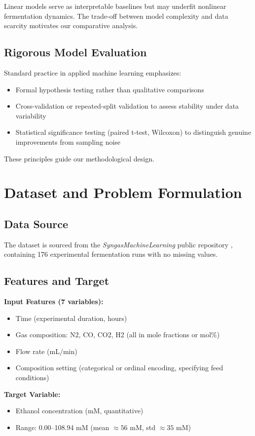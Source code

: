 \documentclass[conference]{IEEEtran}
\begin{document}
Linear models serve as interpretable baselines but may underfit nonlinear fermentation dynamics. The trade-off between model complexity and data scarcity motivates our comparative analysis.

\subsection{Rigorous Model Evaluation}
Standard practice in applied machine learning emphasizes:
\begin{itemize}
\item Formal hypothesis testing rather than qualitative comparisons \cite{breiman2001}
\item Cross-validation or repeated-split validation to assess stability under data variability
\item Statistical significance testing (paired t-test, Wilcoxon) to distinguish genuine improvements from sampling noise
\end{itemize}

These principles guide our methodological design.

\section{Dataset and Problem Formulation}

\subsection{Data Source}
The dataset is sourced from the \textit{SyngasMachineLearning} public repository \cite{syngasrepo}, containing 176 experimental fermentation runs with no missing values.

\subsection{Features and Target}
\textbf{Input Features (7 variables):}
\begin{itemize}
\item Time (experimental duration, hours)
\item Gas composition: N2, CO, CO2, H2 (all in mole fractions or mol\%)
\item Flow rate (mL/min)
\item Composition setting (categorical or ordinal encoding, specifying feed conditions)
\end{itemize}

\textbf{Target Variable:}
\begin{itemize}
\item Ethanol concentration (mM, quantitative)
\item Range: 0.00–108.94 mM (mean $\approx 56$ mM, std $\approx 35$ mM)
\end{itemize}
\end{document}
